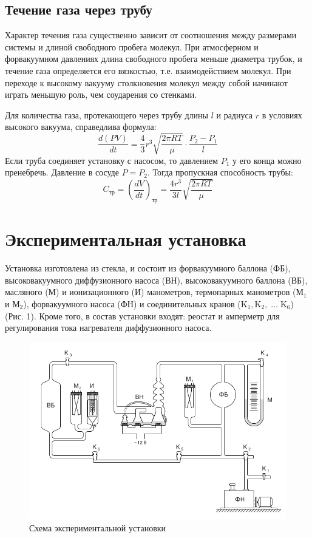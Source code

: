 \documentclass[a4paper,12pt]{article}
\begin{document}
\subsection{Течение газа через трубу}

	Характер течения газа существенно зависит от соотношения между размерами
	системы и длиной свободного пробега молекул. При атмосферном и форвакуумном
	давлениях  длина свободного пробега меньше диаметра трубок, и течение газа
	определяется его вязкостью, т.е. взаимодействием молекул. При переходе к
	высокому вакууму столкновения молекул между собой начинают играть меньшую
	роль, чем соударения со стенками.

	Для количества газа, протекающего через трубу длины $l$ и радиуса $r$ в
	условиях высокого вакуума, справедлива формула: \begin{equation}
	\frac{d(PV)}{dt} = \frac{4}{3}r^3\sqrt{\frac{2\pi RT}{\mu}}\cdot\frac{P_2 -
	P_1}{l} \label{kap} \end{equation} Если труба соединяет установку с
    насосом, то
	давлением $P_1$ у его конца можно пренебречь. Давление в сосуде $P = P_2$.
	Тогда пропускная способность трубы: \begin{equation} C_\text{тр} =
	\left(\frac{dV}{dt}\right)_\text{тр} = \frac{4r^3}{3l}\sqrt{\frac{2\pi
	RT}{\mu}} \label{ty} \end{equation}

\section{Экспериментальная установка}

    Установка изготовлена из стекла,
	и состоит из форвакуумного баллона (ФБ), высоковакуумного диффузионного
	насоса (ВН), высоковакуумного баллона (ВБ), масляного (М) и ионизационного
	(И) манометров, термопарных манометров ($\text{М}_1$ и $\text{М}_2$),
	форвакуумного насоса (ФН) и соединительных кранов ($\text{K}_1,
	\text{K}_2,\; \ldots \;\text{K}_6$) (Рис. 1). Кроме того, в
	состав установки входят: реостат и амперметр для регулирования тока
	нагревателя диффузионного насоса.

    \begin{figure}[H]
        \centering
        \includegraphics[scale=2]{stand.png}
        \caption{Схема экспериментальной установки}
        \label{facility}
    \end{figure}
\end{document}
